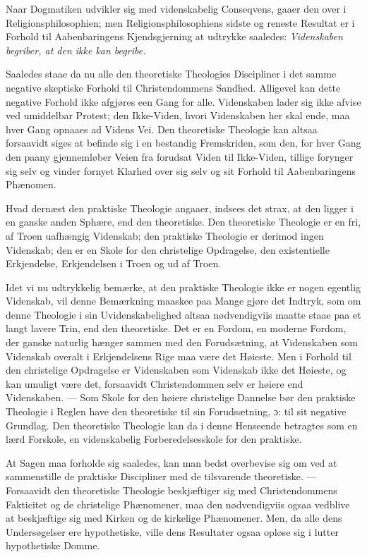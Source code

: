 \documentclass[12pt,a4paper]{book}
\newcommand{\opage}[1]{\marginnote{\footnotesize\textit{[#1]}}}
\begin{document}
Naar Dogmatiken udvikler sig med videnskabelig Conseqvens, gaaer den over i
Religionsphilosophien; men Religionsphilosophiens sidste og reneste Resultat er i
Forhold til Aabenbaringens Kjendsgjerning at udtrykke saaledes:
\emph{Videnskaben begriber, at den ikke kan begribe.}

Saaledes staae da nu alle den theoretiske Theologies Discipliner i det samme
negative skeptiske Forhold til Christendommens Sandhed. Alligevel kan dette
negative Forhold ikke afgjøres een Gang for alle. Videnskaben lader sig ikke
afvise ved umiddelbar Protest; den Ikke-Viden, hvori Videnskaben her skal ende,
maa hver Gang opnaaes ad Videns Vei. Den theoretiske Theologie kan altsaa
forsaavidt siges at befinde sig i en bestandig Fremskriden, som den, for hver
Gang den paany gjennemløber Veien fra forudsat Viden til Ikke-Viden, tillige
forynger sig selv og vinder fornyet Klarhed over sig selv og sit Forhold til
Aabenbaringens Phænomen.

Hvad dernæst den praktiske Theologie angaaer, indsees det strax, at den ligger i
en ganske anden Sphære, end den theoretiske. Den theoretiske Theologie er en
fri, af Troen uafhængig Videnskab; den praktiske Theologie er derimod ingen
Videnskab;
\opage{151} den er en Skole for den christelige Opdragelse, den existentielle Erkjendelse,
Erkjendelsen i Troen og ud af Troen.

Idet vi nu udtrykkelig bemærke, at den praktiske Theologie ikke er nogen
egentlig Videnskab, vil denne Bemærkning maaskee paa Mange gjøre det Indtryk,
som om denne Theologie i sin Uvidenskabelighed altsaa nødvendigviis maatte staae
paa et langt lavere Trin, end den theoretiske. Det er en Fordom, en moderne
Fordom, der ganske naturlig hænger sammen med den Forudsætning, at Videnskaben
som Videnskab overalt i Erkjendelsens Rige maa være det Høieste. Men i Forhold
til den christelige Opdragelse er Videnskaben som Videnskab ikke det Høieste, og
kan umuligt være det, forsaavidt Christendommen selv er høiere end Videnskaben.
--- Som Skole for den høiere christelige Dannelse bør den praktiske Theologie i
Reglen have den theoretiske til sin Forudsætning, ɔ: til sit negative Grundlag.
Den theoretiske Theologie kan da i denne Henseende betragtes som en lærd
Forskole, en videnskabelig Forberedelsesskole for den praktiske.

At Sagen maa forholde sig saaledes, kan man bedst overbevise sig om ved at
sammenstille de praktiske Discipliner med de tilsvarende theoretiske. ---
Forsaavidt den theoretiske Theologie beskjæftiger sig med Christendommens
Fakticitet og de christelige Phænomener, maa den nødvendigviis ogsaa vedblive at
beskjæftige sig med Kirken og de kirkelige Phænomener. Men, da alle dens
Undersøgelser ere hypothetiske, ville dens Resultater ogsaa opløse sig i lutter
hypothetiske Domme.
\end{document}
